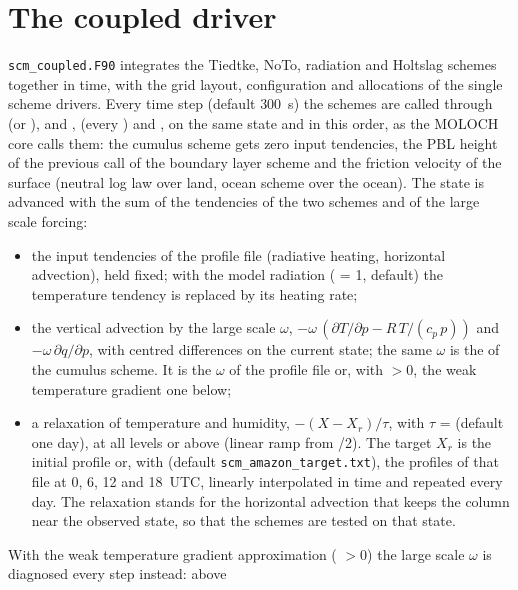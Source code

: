 \section{The coupled driver}

\verb=scm_coupled.F90= integrates the Tiedtke, NoTo, radiation and
Holtslag schemes together in time, with the grid layout, configuration
and allocations of the single scheme drivers. Every time step
 (default 300~s) the schemes are called through
 (or ),  and
,  (every ) and ,
on the same
state and in this order, as the MOLOCH core calls them: the
cumulus scheme gets zero input tendencies, the PBL height of the previous
call of the boundary layer scheme and the friction velocity of the
surface (neutral log law over land, ocean scheme over the ocean). The state is advanced with the sum of the tendencies of the two
schemes and of the large scale forcing:
\begin{itemize}
  \item the input tendencies of the profile file (radiative heating,
        horizontal advection), held fixed; with the model radiation
        ( = 1, default) the temperature tendency is replaced
        by its heating rate;
  \item the vertical advection by the large scale $\omega$,
        $-\omega\,(\partial T/\partial p - R\,T/(c_p\,p))$ and
        $-\omega\,\partial q/\partial p$, with centred differences on the
        current state; the same $\omega$ is the  of the
        cumulus scheme. It is the $\omega$ of the profile file or, with
         $> 0$, the weak temperature gradient one below;
  \item a relaxation of temperature and humidity,
        $-(X - X_r)/\tau$, with $\tau$ =  (default one day),
        at all levels or above  (linear ramp from
        /2). The target $X_r$ is the initial profile or,
        with  (default \verb=scm_amazon_target.txt=), the
        profiles of that file at 0, 6, 12 and 18~UTC, linearly
        interpolated in time and repeated every day. The relaxation stands
        for the horizontal advection that keeps the column near the
        observed state, so that the schemes are tested on that state.
\end{itemize}
With the weak temperature gradient approximation ( $> 0$)
the large scale $\omega$ is diagnosed every step instead: above
